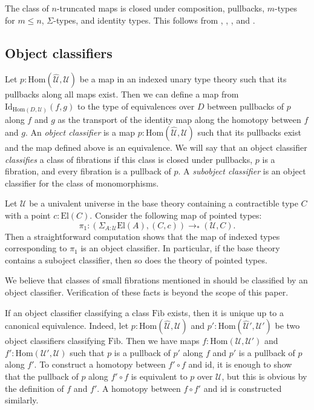 \documentclass[reqno]{mscs}
\newcommand{\fs}[1]{\mathrm{#1}}
\newcommand{\Hom}{\fs{Hom}}
\newcommand{\Id}{\fs{Id}}
\newcommand{\Fib}{\fs{Fib}}
\newcommand{\El}{\fs{El}}
\numberwithin{figure}{section}
\begin{document}
\begin{example}
The class of $n$-truncated maps is closed under composition, pullbacks, $m$-types for $m \leq n$, $\Sigma$-types, and identity types.
This follows from , , , and .
\end{example}

\subsection{Object classifiers}

Let $p : \Hom(\widehat{\mathcal{U}},\mathcal{U})$ be a map in an indexed unary type theory such that its pullbacks along all maps exist.
Then we can define a map from $\Id_{\Hom(D,\mathcal{U})}(f,g)$ to the type of equivalences over $D$ between pullbacks of $p$ along $f$ and $g$ as the transport of the identity map along the homotopy between $f$ and $g$.
An \emph{object classifier} is a map $p : \Hom(\widehat{\mathcal{U}},\mathcal{U})$ such that its pullbacks exist and the map defined above is an equivalence.
We will say that an object classifier \emph{classifies} a class of fibrations if this class is closed under pullbacks, $p$ is a fibration, and every fibration is a pullback of $p$.
A \emph{subobject classifier} is an object classifier for the class of monomorphisms.

\begin{example}
Let $\mathcal{U}$ be a univalent universe in the base theory containing a contractible type $C$ with a point $c : \El(C)$.
Consider the following map of pointed types:
\[ \pi_1 : (\Sigma_{A : \mathcal{U}} \El(A), (C, c)) \to_* (\mathcal{U}, C). \]
Then a straightforward computation shows that the map of indexed types corresponding to $\pi_1$ is an object classifier.
In particular, if the base theory contains a suboject classifier, then so does the theory of pointed types.
\end{example}

\begin{example}
We believe that classes of small fibrations mentioned in  should be classified by an object classifier.
Verification of these facts is beyond the scope of this paper.
\end{example}

If an object classifier classifying a class $\Fib$ exists, then it is unique up to a canonical equivalence.
Indeed, let $p : \Hom(\widehat{\mathcal{U}},\mathcal{U})$ and $p' : \Hom(\widehat{\mathcal{U}}',\mathcal{U}')$ be two object classifiers classifying $\Fib$.
Then we have maps $f : \Hom(\mathcal{U},\mathcal{U}')$ and $f' : \Hom(\mathcal{U}',\mathcal{U})$ such that $p$ is a pullback of $p'$ along $f$ and $p'$ is a pullback of $p$ along $f'$.
To construct a homotopy between $f' \circ f$ and $\fs{id}$, it is enough to show that the pullback of $p$ along $f' \circ f$ is equivalent to $p$ over $\mathcal{U}$, but this is obvious by the definition of $f$ and $f'$.
A homotopy between $f \circ f'$ and $\fs{id}$ is constructed similarly.
\end{document}
